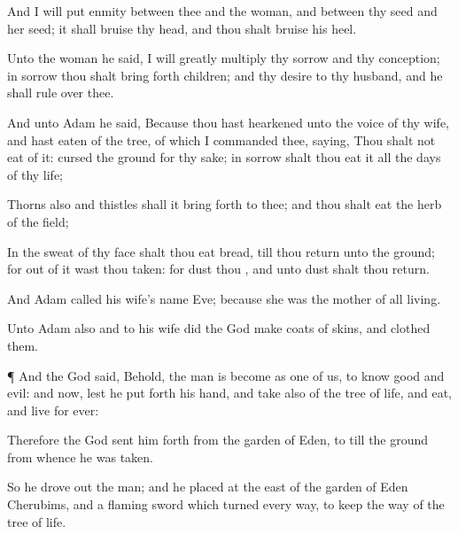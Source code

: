 {And I will
put
enmity between thee and the
woman, and between thy
seed and her
seed; it shall
bruise thy
head, and thou shalt
bruise his
heel.

Unto the
woman he
said, I will
greatly
multiply thy
sorrow and thy
conception; in
sorrow thou shalt bring
forth
children; and thy
desire
{} to thy
husband, and he shall
rule over thee.


\par }{\PP {}And unto
Adam he
said, Because thou hast
hearkened unto the
voice of thy
wife, and hast
eaten of the
tree, of
which I commanded
thee,
saying, Thou shalt not
eat of it:
cursed
{} the
ground for thy sake; in
sorrow shalt thou
eat
{} it
all the
days of thy
life;

Thorns
also and
thistles shall it bring
forth to thee; and thou shalt
eat the
herb of the
field;

In the
sweat of thy
face shalt thou
eat
bread,
till thou
return unto the
ground; for out of it wast thou
taken: for
dust
thou
{}, and unto
dust shalt thou
return.

And
Adam
called his
wife’s
name
Eve; because she was the
mother of all
living.

Unto
Adam also and to his
wife did the
{}
God
make
coats of
skins, and clothed
them.


\par }{\PP {}¶ And the
{}
God
said,
Behold, the
man is become as
one of us, to
know
good and
evil: and now, lest he put
forth his
hand, and
take also of the
tree of
life, and
eat, and
live for
ever:

Therefore the
{}
God sent him
forth from the
garden of
Eden, to
till the
ground from whence he was
taken.

So he drove
out the
man; and he
placed at the
east of the
garden of
Eden
Cherubims, and a
flaming
sword which turned every
way, to
keep the
way of the
tree of
life.




\par }
